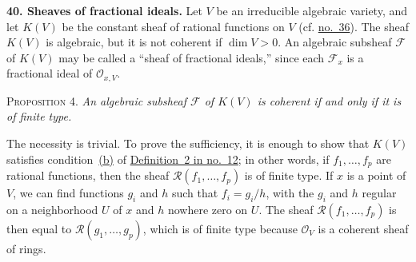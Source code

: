 
\medskip
{}\label{fac:II:2:no:40}
\textbf{40. Sheaves of fractional ideals.}
\label{fac:II:2:no:40:def:fractional-ideal-sheaf}
Let $V$ be an irreducible algebraic variety, and let $K(V)$ be the constant sheaf of rational functions on $V$ (cf. \hyperref[fac:II:1:no:36]{no.~36}). The sheaf $K(V)$ is algebraic, but it is not coherent if $\dim V>0$. An algebraic subsheaf $\mathcal{F}$ of $K(V)$ may be called a ``sheaf of fractional ideals,'' since each $\mathcal{F}_x$ is a fractional ideal of $\mathcal{O}_{x,V}$.

\label{fac:II:2:no:40:prop:4}
\textsc{Proposition 4.} \textit{An algebraic subsheaf $\mathcal{F}$ of $K(V)$ is coherent if and only if it is of finite type.}

The necessity is trivial. To prove the sufficiency, it is enough to show that $K(V)$ satisfies condition~\hyperref[fac:I:2:no:12:def:2:item:b]{(b)} of \hyperref[fac:I:2:no:12:def:2]{Definition~2 in no.~12}; in other words, if $f_1,\ldots,f_p$ are rational functions, then the sheaf $\mathcal{R}(f_1,\ldots,f_p)$ is of finite type. If $x$ is a point of $V$, we can find functions $g_i$ and $h$ such that $f_i=g_i/h$, with the $g_i$ and $h$ regular on a neighborhood $U$ of $x$ and $h$ nowhere zero on $U$. The sheaf $\mathcal{R}(f_1,\ldots,f_p)$ is then equal to $\mathcal{R}(g_1,\ldots,g_p)$, which is of finite type because $\mathcal{O}_V$ is a coherent sheaf of rings.
